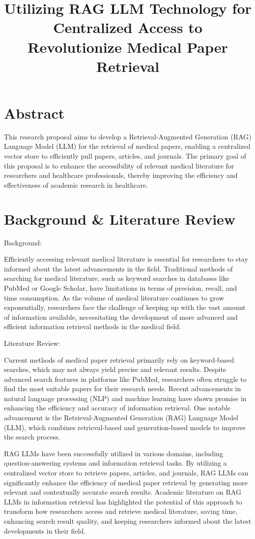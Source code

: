 \documentclass{article}
\title{Utilizing RAG LLM Technology for Centralized Access to Revolutionize Medical Paper Retrieval}
\date{}
\begin{document}
\maketitle

\section*{Abstract}
This research proposal aims to develop a Retrieval-Augmented Generation (RAG) Language Model (LLM) for the retrieval of medical papers, enabling a centralized vector store to efficiently pull papers, articles, and journals. The primary goal of this proposal is to enhance the accessibility of relevant medical literature for researchers and healthcare professionals, thereby improving the efficiency and effectiveness of academic research in healthcare.

\section*{Background \& Literature Review}
Background:

Efficiently accessing relevant medical literature is essential for researchers to stay informed about the latest advancements in the field. Traditional methods of searching for medical literature, such as keyword searches in databases like PubMed or Google Scholar, have limitations in terms of precision, recall, and time consumption. As the volume of medical literature continues to grow exponentially, researchers face the challenge of keeping up with the vast amount of information available, necessitating the development of more advanced and efficient information retrieval methods in the medical field.

Literature Review:

Current methods of medical paper retrieval primarily rely on keyword-based searches, which may not always yield precise and relevant results. Despite advanced search features in platforms like PubMed, researchers often struggle to find the most suitable papers for their research needs. Recent advancements in natural language processing (NLP) and machine learning have shown promise in enhancing the efficiency and accuracy of information retrieval. One notable advancement is the Retrieval-Augmented Generation (RAG) Language Model (LLM), which combines retrieval-based and generation-based models to improve the search process.

RAG LLMs have been successfully utilized in various domains, including question-answering systems and information retrieval tasks. By utilizing a centralized vector store to retrieve papers, articles, and journals, RAG LLMs can significantly enhance the efficiency of medical paper retrieval by generating more relevant and contextually accurate search results. Academic literature on RAG LLMs in information retrieval has highlighted the potential of this approach to transform how researchers access and retrieve medical literature, saving time, enhancing search result quality, and keeping researchers informed about the latest developments in their field.
\end{document}
